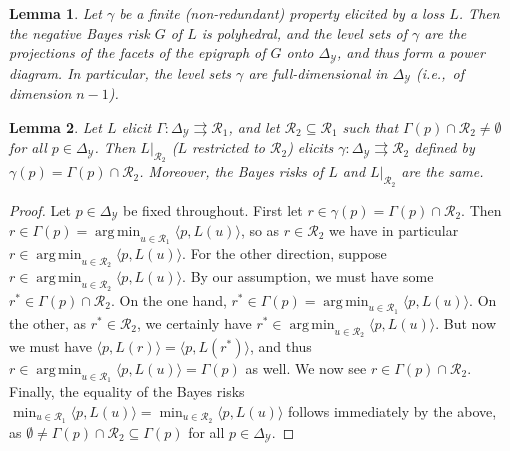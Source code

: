 \documentclass[12pt]{article}
\newcommand{\simplex}{\Delta_\Y}
\newcommand{\R}{\mathcal{R}}
\newcommand{\Y}{\mathcal{Y}}
\newcommand{\inprod}[2]{\langle #1, #2 \rangle}%
\newcommand{\toto}{\rightrightarrows}
\DeclareMathOperator*{\argmin}{arg\,min}
\newtheorem{lemma}{Lemma}
\begin{document}
\begin{lemma}\label{lem:finite-full-dim}
  Let $\gamma$ be a finite (non-redundant) property elicited by a loss $L$.
  Then the negative Bayes risk $G$ of $L$ is polyhedral, and the level sets of $\gamma$ are the projections of the facets of the epigraph of $G$ onto $\simplex$, and thus form a power diagram.
  In particular, the level sets $\gamma$ are full-dimensional in $\simplex$ (i.e.,\ of dimension $n-1$).
\end{lemma}

\begin{lemma}\label{lem:loss-restrict}
  Let $L$ elicit $\Gamma:\simplex\toto\R_1$, and let $\R_2\subseteq\R_1$ such that $\Gamma(p) \cap \R_2 \neq \emptyset$ for all $p\in\simplex$.
  Then $L|_{\R_2}$ ($L$ restricted to $\R_2$) elicits $\gamma:\simplex\toto\R_2$ defined by $\gamma(p) = \Gamma(p)\cap \R_2$.
  Moreover, the Bayes risks of $L$ and $L|_{\R_2}$ are the same.
\end{lemma}
\begin{proof}
  Let $p\in\simplex$ be fixed throughout.
  First let $r \in \gamma(p) = \Gamma(p) \cap \R_2$.
  Then $r \in \Gamma(p) = \argmin_{u\in\R_1} \inprod{p}{L(u)}$, so as $r\in\R_2$ we have in particular $r \in \argmin_{u\in\R_2} \inprod{p}{L(u)}$.
  For the other direction, suppose $r \in \argmin_{u\in\R_2} \inprod{p}{L(u)}$.
  By our assumption, we must have some $r^* \in \Gamma(p) \cap \R_2$.
  On the one hand, $r^*\in\Gamma(p) = \argmin_{u\in\R_1} \inprod{p}{L(u)}$.
  On the other, as $r^* \in \R_2$, we certainly have $r^* \in \argmin_{u\in\R_2} \inprod{p}{L(u)}$.
  But now we must have $\inprod{p}{L(r)} = \inprod{p}{L(r^*)}$, and thus $r \in \argmin_{u\in\R_1} \inprod{p}{L(u)} = \Gamma(p)$ as well.
  We now see $r \in \Gamma(p) \cap \R_2$.
  Finally, the equality of the Bayes risks $\min_{u\in\R_1} \inprod{p}{L(u)} = \min_{u\in\R_2} \inprod{p}{L(u)}$ follows immediately by the above, as $\emptyset \neq \Gamma(p)\cap\R_2 \subseteq \Gamma(p)$ for all $p\in\simplex$.
\end{proof}
\end{document}
